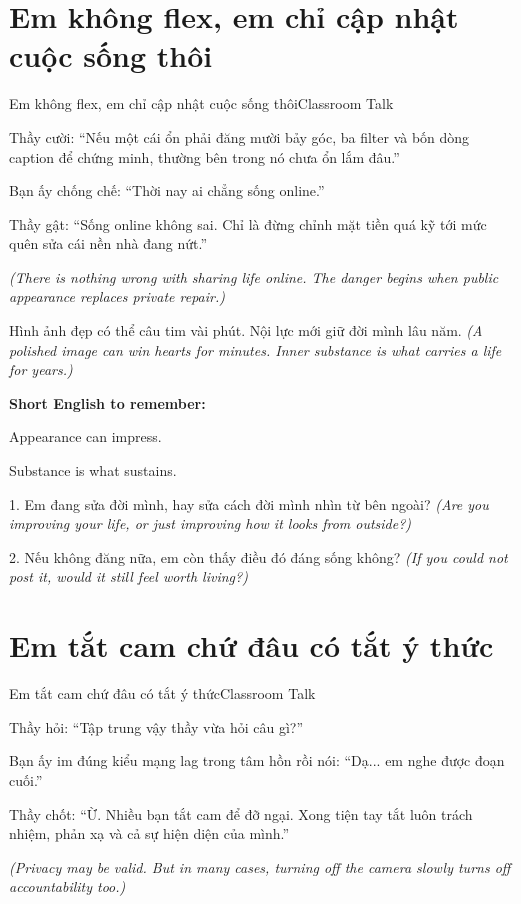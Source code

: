 \section{Em không flex, em chỉ cập nhật cuộc sống thôi}
\begin{truyen}{Em không flex, em chỉ cập nhật cuộc sống thôi}{Classroom Talk}

Thầy cười: ``Nếu một cái ổn phải đăng mười bảy góc, ba filter và bốn dòng caption để chứng minh, thường bên trong nó chưa ổn lắm đâu.''

Bạn ấy chống chế: ``Thời nay ai chẳng sống online.''

Thầy gật: ``Sống online không sai. Chỉ là đừng chỉnh mặt tiền quá kỹ tới mức quên sửa cái nền nhà đang nứt.''

\textit{(There is nothing wrong with sharing life online. The danger begins when public appearance replaces private repair.)}
\end{truyen}

\begin{baihoc}
Hình ảnh đẹp có thể câu tim vài phút. Nội lực mới giữ đời mình lâu năm.
\textit{(A polished image can win hearts for minutes. Inner substance is what carries a life for years.)}
\end{baihoc}

\begin{ghinhoanh}
\textbf{Short English to remember:}

Appearance can impress.

Substance is what sustains.
\end{ghinhoanh}

\begin{tuhocnhanh}
1. Em đang sửa đời mình, hay sửa cách đời mình nhìn từ bên ngoài? \textit{(Are you improving your life, or just improving how it looks from outside?)}

2. Nếu không đăng nữa, em còn thấy điều đó đáng sống không? \textit{(If you could not post it, would it still feel worth living?)}
\end{tuhocnhanh}
\ngancach

\section{Em tắt cam chứ đâu có tắt ý thức}
\begin{truyen}{Em tắt cam chứ đâu có tắt ý thức}{Classroom Talk}

Thầy hỏi: ``Tập trung vậy thầy vừa hỏi câu gì?''

Bạn ấy im đúng kiểu mạng lag trong tâm hồn rồi nói: ``Dạ... em nghe được đoạn cuối.''

Thầy chốt: ``Ừ. Nhiều bạn tắt cam để đỡ ngại. Xong tiện tay tắt luôn trách nhiệm, phản xạ và cả sự hiện diện của mình.''

\textit{(Privacy may be valid. But in many cases, turning off the camera slowly turns off accountability too.)}
\end{truyen}

